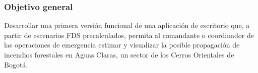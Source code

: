 \subsubsection{Objetivo general}\label{sec:objetivogeneral}Desarrollar una primera versión funcional de una aplicación de escritorio que, a partir de escenarios FDS precalculados, permita al comandante o coordinador de las operaciones de emergencia estimar y visualizar la posible propagación de incendios forestales en Aguas Claras, un sector de los Cerros Orientales de Bogotá.
